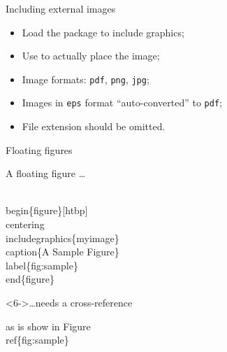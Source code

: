 \begin{frame}[fragile]{Including external images}

  \begin{itemize}
    \item Load the  package to include graphics;
    \item Use  to actually place the image;
    \item Image formats: \texttt{pdf}, \texttt{png}, \texttt{jpg};
    \item Images in \texttt{eps} format \enquote{auto-converted} to
      \texttt{pdf};
    \item File extension should be omitted.
  \end{itemize}
  
  \vspace{1 em}

\end{frame}


\begin{frame}[fragile]{Floating figures}

  \begin{block}{A floating figure \dots}
\begin{semiverbatim}
\\begin\{figure\}\alert<2>{[htbp]}
  \alert<3>{\\centering}
  \\includegraphics\{myimage\}
  \alert<4>{\\caption\{A Sample Figure\}}
  \alert<5>{\\label\{fig:sample\}}
\\end\{figure\}
\end{semiverbatim}
  \end{block}
  
  \begin{block}<6->{\ldots needs a cross-reference}
\begin{semiverbatim}
as is show in Figure~\alert<6>{\\ref\{fig:sample\}}
\end{semiverbatim}
  \end{block}

\end{frame}

